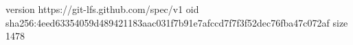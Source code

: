 version https://git-lfs.github.com/spec/v1
oid sha256:4eed63354059d489421183aac031f7b91e7afccd7f7f3f52dec76fba47c072af
size 1478

